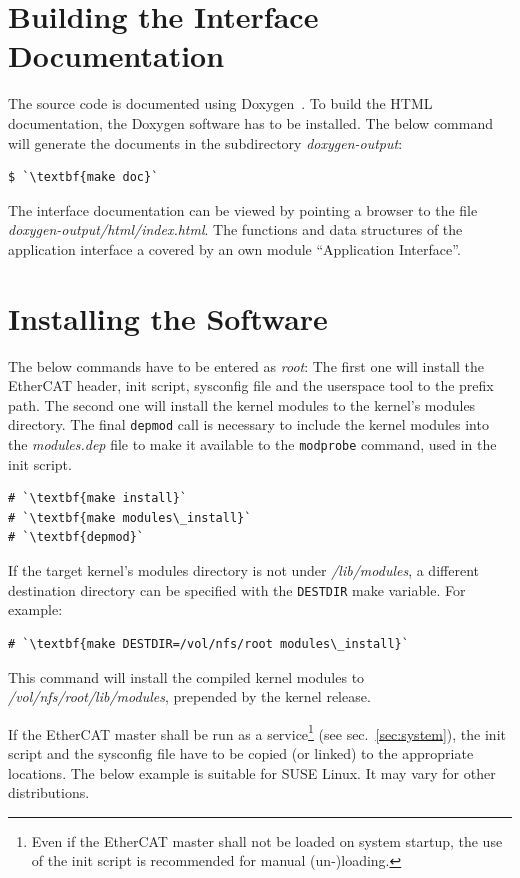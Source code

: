 \documentclass[a4paper,12pt,BCOR6mm,bibtotoc,idxtotoc]{scrbook}
\begin{document}
\section{Building the Interface Documentation}
\label{sec:gendoc}

The source code is documented using Doxygen~\cite{doxygen}. To build the HTML
documentation, the Doxygen software has to be installed. The below command
will generate the documents in the subdirectory \textit{doxygen-output}:

\begin{lstlisting}
$ `\textbf{make doc}`
\end{lstlisting}

The interface documentation can be viewed by pointing a browser to the file
\textit{doxygen-output/html/index.html}. The functions and data structures of
the application interface a covered by an own module ``Application
Interface''.

\section{Installing the Software}

The below commands have to be entered as \textit{root}: The first one will
install the EtherCAT header, init script, sysconfig file and the userspace
tool to the prefix path. The second one will install the kernel modules to the
kernel's modules directory. The final \lstinline+depmod+ call is necessary to
include the kernel modules into the \textit{modules.dep} file to make it
available to the \lstinline+modprobe+ command, used in the init script. 

\begin{lstlisting}
# `\textbf{make install}`
# `\textbf{make modules\_install}`
# `\textbf{depmod}`
\end{lstlisting}

If the target kernel's modules directory is not under \textit{/lib/modules}, a
different destination directory can be specified with the \lstinline+DESTDIR+
make variable. For example:

\begin{lstlisting}
# `\textbf{make DESTDIR=/vol/nfs/root modules\_install}`
\end{lstlisting}

This command will install the compiled kernel modules to
\textit{/vol/nfs/root/lib/modules}, prepended by the kernel release.

If the EtherCAT master shall be run as a service\footnote{Even if the EtherCAT
master shall not be loaded on system startup, the use of the init script is
recommended for manual (un-)loading.} (see sec.~\ref{sec:system}), the init
script and the sysconfig file have to be copied (or linked) to the appropriate
locations. The below example is suitable for SUSE Linux. It may vary for other
distributions.
\end{document}
